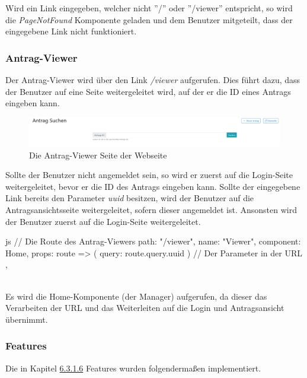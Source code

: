 Wird ein Link eingegeben, welcher nicht ''/'' oder ''/viewer'' entspricht, so wird die \textit{PageNotFound} Komponente geladen und dem Benutzer mitgeteilt, dass der eingegebene Link nicht funktioniert.
\subsubsection{Antrag-Viewer}
\label{sec:antrag_viewer}
Der Antrag-Viewer wird über den Link \textit{/viewer} aufgerufen. Dies führt dazu, dass der Benutzer auf eine Seite weitergeleitet wird, auf der er die ID eines Antrags eingeben kann.
\begin{figure}[H]
	\centering
	\includegraphics[width=1\linewidth]{images/antrag_viewer}
	\caption[Webseite Antrag-Viewer]{Die Antrag-Viewer Seite der Webseite}
	\label{fig:antragviewer}
\end{figure}

Sollte der Benutzer nicht angemeldet sein, so wird er zuerst auf die Login-Seite weitergeleitet, bevor er die ID des Antrags eingeben kann. Sollte der eingegebene Link bereits den Parameter \textit{uuid} besitzen, wird der Benutzer auf die Antragsansichtsseite weitergeleitet, sofern dieser angemeldet ist. Ansonsten wird der Benutzer zuerst auf die Login-Seite weitergeleitet.
\begin{code}{js}
	{
		// Die Route des Antrag-Viewers
		path: "/viewer",
		name: "Viewer",
		component: Home,
		props: route => ({ query: route.query.uuid }) // Der Parameter in der URL
	},
\end{code}
~\\
Es wird die Home-Komponente (der Manager) aufgerufen, da dieser das Verarbeiten der URL und das Weiterleiten auf die Login und Antragsansicht übernimmt.
\newpage
\subsubsection{Features}
Die in Kapitel \hyperref[sec:feature]{6.3.1.6} Features wurden folgendermaßen implementiert.

